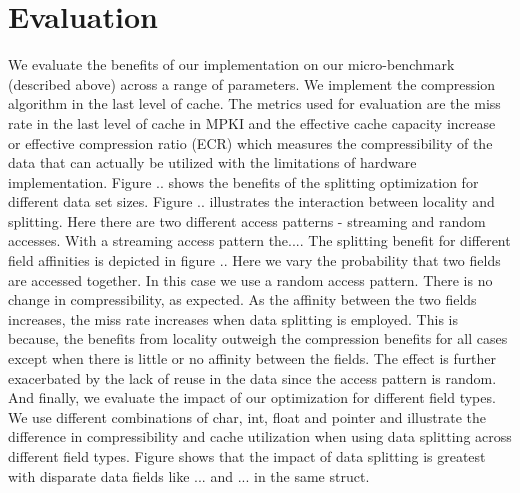 \section{Evaluation}
\label{sec:eval}
We evaluate the benefits of our implementation on our micro-benchmark (described above) across a range of parameters. We implement the compression algorithm in the last level of cache. The metrics used for evaluation are the miss rate in the last level of cache in MPKI and the effective cache capacity increase or effective compression ratio (ECR) which measures the compressibility of the data that can actually be utilized with the limitations of hardware implementation. Figure .. shows the benefits of the splitting optimization for different data set sizes. Figure .. illustrates the interaction between locality and splitting. Here there are two different access patterns - streaming and random accesses. With a streaming access pattern the.... The splitting benefit for different field affinities is depicted in figure .. Here we vary the probability that two fields are accessed together. In this case we use a random access pattern. There is no change in compressibility, as expected. As the affinity between the two fields increases, the miss rate increases when data splitting is employed. This is because, the benefits from locality outweigh the compression benefits for all cases except when there is little or no affinity between the fields. The effect is further exacerbated by the lack of reuse in the data since the access pattern is random. And finally, we evaluate the impact of our optimization for different field types. We use different combinations of char, int, float and pointer and illustrate the difference in compressibility and cache utilization when using data splitting across different field types. Figure shows that the impact of data splitting is greatest with disparate data fields like ... and ... in the same struct. 

